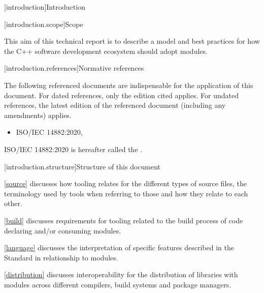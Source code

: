 
[introduction]{Introduction}

[introduction.scope]{Scope}

\pnum
{}%
This aim of this technical report is to describe a model and best practices for
how the C++ software development ecosystem should adopt modules.
%

%
[introduction.references]{Normative references}

\pnum
{}%
The following referenced documents are indispensable for the application of this
document.
For dated references, only the edition cited applies.
For undated references, the latest edition of the referenced document
(including any amendments) applies.

\begin{itemize}
\item ISO/IEC 14882:2020, 
\end{itemize}

\pnum
ISO/IEC 14882:2020 is hereafter called the .

[introduction.structure]{Structure of this document}

%

\pnum \ref{source} discusses how tooling relates for the different
types of \Cpp{} source files, the terminology used by tools when
referring to those and how they relate to each other.

\pnum \ref{build} discusses requirements for tooling related to the
build process of code declaring and/or consuming \Cpp{} modules.

\pnum \ref{language} discusses the interpretation of specific
features described in the \Cpp{} Standard in relationship to modules.

\pnum \ref{distribution} discusses interoperability for the distribution of
\Cpp{} libraries with modules across different compilers, build
systems and package managers.

%
